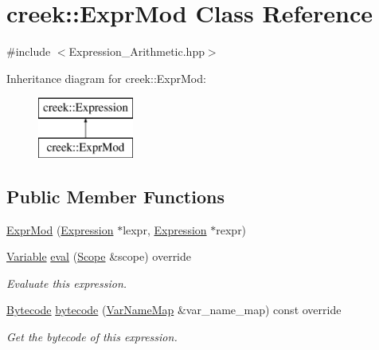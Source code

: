 \hypertarget{classcreek_1_1_expr_mod}{}\section{creek\+:\+:Expr\+Mod Class Reference}
\label{classcreek_1_1_expr_mod}


{\ttfamily \#include $<$Expression\+\_\+\+Arithmetic.\+hpp$>$}

Inheritance diagram for creek\+:\+:Expr\+Mod\+:\begin{figure}[H]
\begin{center}
\leavevmode
\includegraphics[height=2.000000cm]{classcreek_1_1_expr_mod}
\end{center}
\end{figure}
\subsection*{Public Member Functions}
\begin{DoxyCompactItemize}
\item 
\hyperlink{classcreek_1_1_expr_mod_a0e2c74d048120c0cc22ba15ac88012d1}{Expr\+Mod} (\hyperlink{classcreek_1_1_expression}{Expression} $\ast$lexpr, \hyperlink{classcreek_1_1_expression}{Expression} $\ast$rexpr)
\item 
\hyperlink{classcreek_1_1_variable}{Variable} \hyperlink{classcreek_1_1_expr_mod_a974e82bd8d5475d0ccb581f8bcfa50f9}{eval} (\hyperlink{classcreek_1_1_scope}{Scope} \&scope) override
\begin{DoxyCompactList}\small\item\em Evaluate this expression. \end{DoxyCompactList}\item 
\hyperlink{classcreek_1_1_bytecode}{Bytecode} \hyperlink{classcreek_1_1_expr_mod_a8585ba2adfcbf85bf0c10dd2a879eb85}{bytecode} (\hyperlink{classcreek_1_1_var_name_map}{Var\+Name\+Map} \&var\+\_\+name\+\_\+map) const  override\hypertarget{classcreek_1_1_expr_mod_a8585ba2adfcbf85bf0c10dd2a879eb85}{}\label{classcreek_1_1_expr_mod_a8585ba2adfcbf85bf0c10dd2a879eb85}

\begin{DoxyCompactList}\small\item\em Get the bytecode of this expression. \end{DoxyCompactList}\end{DoxyCompactItemize}


